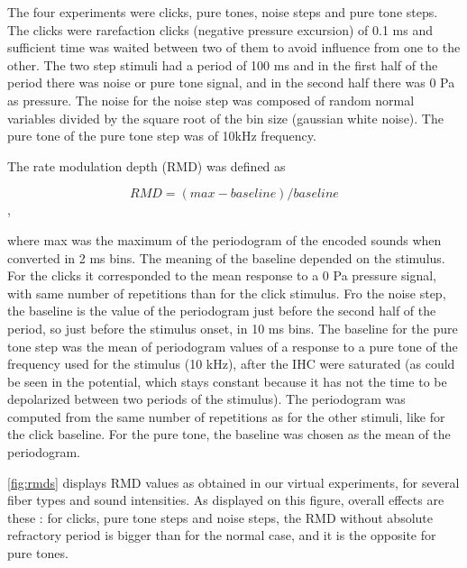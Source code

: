 The four experiments were clicks, pure tones, noise steps and pure tone steps.
The clicks were rarefaction clicks (negative pressure excursion) of 0.1 ms and sufficient time was waited between 
two of them to avoid influence from one to the other.
The two step stimuli had a period of 100 ms and in the first half of the period 
there was noise or pure tone signal, and in the second half there was 0 Pa as pressure.
The noise for the noise step was composed of random normal variables divided 
by the square root of the bin size (gaussian white noise).
The pure tone of the pure tone step was of 10kHz frequency.

The rate modulation depth (RMD) was defined as 

\begin{equation}\label{rmdformula} RMD = (max - baseline) / baseline\end{equation},

where max was 
the maximum of the periodogram of the encoded sounds when converted in 2 ms bins.
The meaning of the baseline depended on the stimulus. 
For the clicks it corresponded to the mean response to a 0 Pa pressure signal,
 with same number of repetitions than for the click stimulus. 
Fro the noise step, the baseline is the value of the periodogram just before the second 
half of the period, so just before the stimulus onset,
 in 10 ms bins. 
The baseline for the pure tone step was the mean of periodogram values
of a response to a pure tone of the frequency used for the stimulus (10 kHz),
after the IHC were saturated (as could be seen in the potential, 
which stays constant because it has not the time 
to be depolarized between two periods of the stimulus). 
The periodogram was computed from the same number of repetitions as for the other stimuli, 
like for the click baseline.
For the pure tone, the baseline was chosen as the mean of the periodogram.

\autoref{fig:rmds} displays RMD values as obtained in our virtual experiments, 
for several fiber types and sound intensities.
As displayed on this figure, overall effects are these :
for clicks, pure tone steps and noise steps, the RMD without absolute refractory
period is bigger than for the normal case, and it is the opposite for pure tones.

